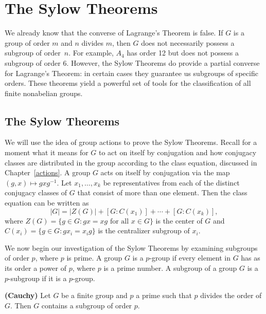 \chapter{The Sylow Theorems}
 
We already know that the converse of Lagrange's Theorem is false.  If $G$ is a group of order $m$ and $n$ divides $m$, then $G$ does not necessarily possess a subgroup of order~$n$.  For example, $A_4$ has order 12 but does not possess a subgroup of order 6.  However, the Sylow Theorems do provide a partial converse for Lagrange's Theorem: in certain cases they guarantee us subgroups of specific orders.  These theorems yield a powerful set of tools for the classification of all finite nonabelian groups.  

 
\section{The Sylow Theorems}

We will use the idea of  group actions to prove the Sylow Theorems.  Recall for a moment what it means for $G$ to act on itself by
conjugation and how conjugacy classes are distributed in the group according to the class equation, discussed in Chapter~\ref{actions}.   A group  $G$ acts on itself by conjugation via the map $(g,x) \mapsto gxg^{-1}$. Let $x_1, \ldots,
x_k$ be representatives from each  of the distinct conjugacy classes
of $G$ that consist of more than one element. Then the class equation
can be written as 
$$
|G| = |Z(G)| + [G: C(x_1) ] + \cdots + [ G: C(x_k)],
$$
where $Z(G) = \{g \in G : gx = xg \mbox{ for all $x \in G$} \}$ is the
center of $G$ and  $C(x_i) = \{ g \in G : g x_i = x_i g \}$ is the
centralizer subgroup of $x_i$. 
 
We now begin our investigation of the Sylow Theorems by examining
subgroups of order $p$, where $p$ is prime. A group $G$ is a {\bfi
$p$-group\/} if every element in $G$ has as
its order
a power of $p$, where $p$ is a prime number. A subgroup of a group $G$
is a {\bfi $p$-subgroup\/} if it is a 
$p$-group.  
 
\begin{theorem} {\bf (Cauchy)}
Let $G$ be a finite group and $p$ a prime such that $p$ divides the
order of $G$. Then $G$ contains a subgroup of order $p$.
\end{theorem}
 
